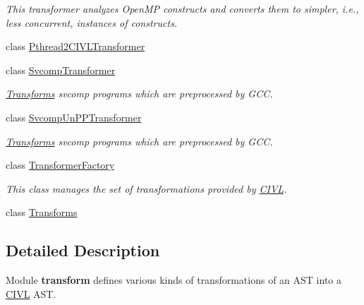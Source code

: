 \begin{DoxyCompactItemize}
\begin{DoxyCompactList}\small\item\em This transformer analyzes Open\+M\+P constructs and converts them to simpler, i.\+e., less concurrent, instances of constructs. \end{DoxyCompactList}\item 
class \hyperlink{classedu_1_1udel_1_1cis_1_1vsl_1_1civl_1_1transform_1_1IF_1_1Pthread2CIVLTransformer}{Pthread2\+C\+I\+V\+L\+Transformer}
\item 
class \hyperlink{classedu_1_1udel_1_1cis_1_1vsl_1_1civl_1_1transform_1_1IF_1_1SvcompTransformer}{Svcomp\+Transformer}
\begin{DoxyCompactList}\small\item\em \hyperlink{classedu_1_1udel_1_1cis_1_1vsl_1_1civl_1_1transform_1_1IF_1_1Transforms}{Transforms} svcomp programs which are preprocessed by G\+C\+C. \end{DoxyCompactList}\item 
class \hyperlink{classedu_1_1udel_1_1cis_1_1vsl_1_1civl_1_1transform_1_1IF_1_1SvcompUnPPTransformer}{Svcomp\+Un\+P\+P\+Transformer}
\begin{DoxyCompactList}\small\item\em \hyperlink{classedu_1_1udel_1_1cis_1_1vsl_1_1civl_1_1transform_1_1IF_1_1Transforms}{Transforms} svcomp programs which are preprocessed by G\+C\+C. \end{DoxyCompactList}\item 
class \hyperlink{classedu_1_1udel_1_1cis_1_1vsl_1_1civl_1_1transform_1_1IF_1_1TransformerFactory}{Transformer\+Factory}
\begin{DoxyCompactList}\small\item\em This class manages the set of transformations provided by \hyperlink{classedu_1_1udel_1_1cis_1_1vsl_1_1civl_1_1CIVL}{C\+I\+V\+L}. \end{DoxyCompactList}\item 
class \hyperlink{classedu_1_1udel_1_1cis_1_1vsl_1_1civl_1_1transform_1_1IF_1_1Transforms}{Transforms}
\end{DoxyCompactItemize}


\subsection{Detailed Description}
Module {\bfseries transform } defines various kinds of transformations of an A\+S\+T into a \hyperlink{classedu_1_1udel_1_1cis_1_1vsl_1_1civl_1_1CIVL}{C\+I\+V\+L} A\+S\+T. 